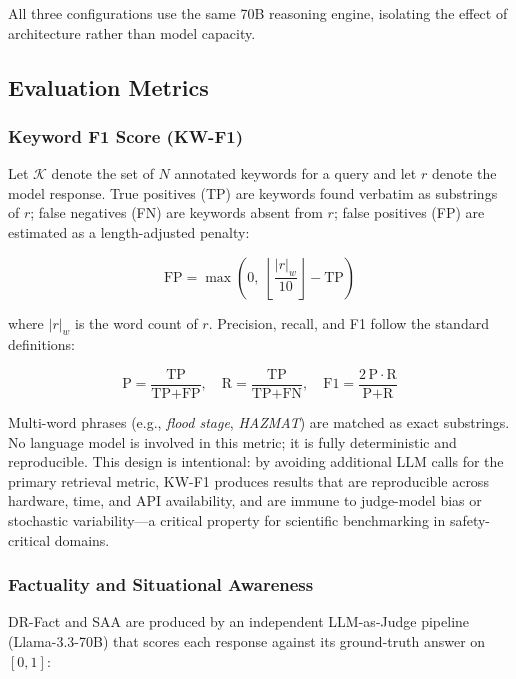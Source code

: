 \documentclass[conference]{IEEEtran}
\begin{document}
All three configurations use the same 70B reasoning engine, isolating
the effect of architecture rather than model capacity.

\subsection{Evaluation Metrics}
\label{sec:metrics}

\subsubsection{Keyword F1 Score (KW-F1)}
Let $\mathcal{K}$ denote the set of $N$ annotated keywords for a
query and let $r$ denote the model response. True positives (TP) are
keywords found verbatim as substrings of $r$; false negatives (FN)
are keywords absent from $r$; false positives (FP) are estimated as
a length-adjusted penalty:

\begin{equation}
  \text{FP} = \max\!\left(0,\;\left\lfloor
    \frac{|r|_w}{10}\right\rfloor - \text{TP}\right)
  \label{eq:fp}
\end{equation}

\noindent where $|r|_w$ is the word count of $r$. Precision, recall,
and F1 follow the standard definitions:

\begin{equation}
  \text{P} = \frac{\text{TP}}{\text{TP}+\text{FP}}, \quad
  \text{R} = \frac{\text{TP}}{\text{TP}+\text{FN}}, \quad
  \text{F1} = \frac{2\,\text{P}\cdot\text{R}}{\text{P}+\text{R}}
  \label{eq:f1}
\end{equation}

\noindent Multi-word phrases (e.g., \textit{flood stage},
\textit{HAZMAT}) are matched as exact substrings. No language model
is involved in this metric; it is fully deterministic and
reproducible. This design is intentional: by avoiding additional LLM
calls for the primary retrieval metric, KW-F1 produces results that
are reproducible across hardware, time, and API availability, and
are immune to judge-model bias or stochastic variability---a
critical property for scientific benchmarking in safety-critical
domains.

\subsubsection{Factuality and Situational Awareness}
DR-Fact and SAA are produced by an independent LLM-as-Judge
pipeline (Llama-3.3-70B) that scores each response against its
ground-truth answer on $[0,1]$:
\end{document}
